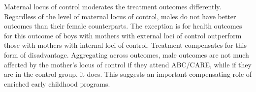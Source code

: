 Maternal locus of control moderates the treatment outcomes differently. Regardless of the level of maternal locus of control, males do not have better outcomes than their female counterparts. The exception is for health outcomes for this outcome of boys with mothers with external loci of control outperform those with mothers with internal loci of control. Treatment compensates for this form of disadvantage. Aggregating across outcomes, male outcomes are not much affected by the mother's locus of control if they attend ABC/CARE, while if they are in the control group, it does. This suggests an important compensating role of enriched early childhood programs.




